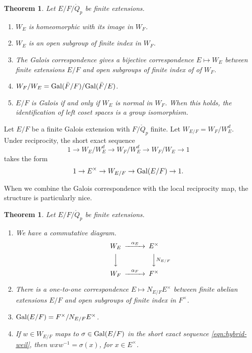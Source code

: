 \documentclass{amsart}
\newtheorem{theorem}[equation]{Theorem}
\def\oG{\op{Gal}}
\begin{document}
\begin{theorem} Let $E/F/\ring{Q}_p$ be finite extensions. 
\begin{enumerate}
\item  $W_E$ is homeomorphic with its image in $W_F$.
\item $W_E$ is an open subgroup of finite index in $W_F$.
\item The Galois correspondence gives a bijective correspondence $E\mapsto W_E$ between
finite extensions $E/F$ and open subgroups  of finite index of of $W_F$.
\item $W_F/W_E = \oG(\bar F/F)/\oG(\bar F/E)$.
\item $E/F$ is Galois if and only if $W_E$ is normal in $W_F$.  When this holds,
the identification of left coset spaces is a group isomorphism.
\end{enumerate}
\end{theorem}

Let $E/F$ be a finite Galois extension with $F/\ring{Q}_p$ finite.
Let $W_{E/F} = W_F/ W^d_E$.  Under reciprocity, the short exact
sequence
\[
1 \to W_E/W_E^d \to W_F/W^d_E \to W_F/W_E \to 1
\]
takes the form
\begin{equation}\label{eqn:hybrid-weil}
1 \to E^\times \to W_{E/F} \to \oG(E/F) \to 1.
\end{equation}

When we combine the Galois correspondence with the local reciprocity
map, the structure is particularly nice.

\begin{theorem}  Let $E/F/\ring{Q}_p$ be finite extensions.  
\begin{enumerate}
\item We have a commutative diagram.
\[
\begin{CD}
W_E @>\alpha_E>> E^\times\\
@VVV @VVN_{E/F}V\\
W_F @>\alpha_F >> F^\times\\
\end{CD}
\]
\item There is a one-to-one correspondence $E\mapsto N_{E/F}E^\times$
between finite abelian extensions
$E/F$ and open subgroups of finite index in $F^\times$.
\item $\oG(E/F) = F^\times/N_{E/F}E^\times$.
\item If $w\in W_{E/F}$ maps to $\sigma\in \oG(E/F)$ in the short exact
sequence \eqref{eqn:hybrid-weil}, then $w x w^{-1} = \sigma(x)$, for $x \in E^\times$.
\end{enumerate}
\end{theorem}
\end{document}
